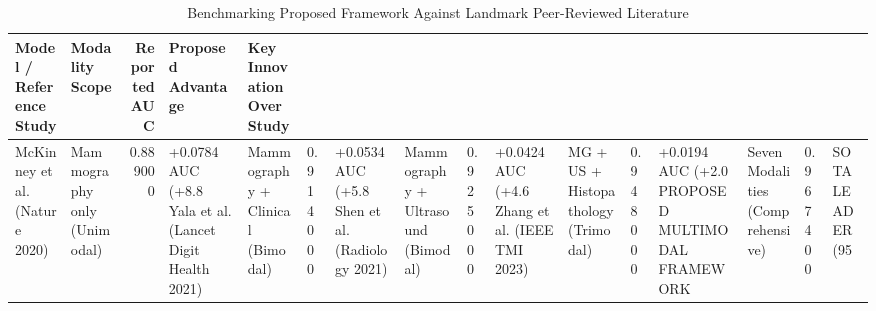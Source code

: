 \begin{table}
\caption{Benchmarking Proposed Framework Against Landmark Peer-Reviewed Literature}
\label{tab:table_6_01_08_benchmark_comparison_against_published_literature}
\begin{tabular}{llrll}
\toprule
Model / Reference Study & Modality Scope & Reported AUC & Proposed Advantage & Key Innovation Over Study \\
\midrule
McKinney et al. (Nature 2020) & Mammography only (Unimodal) & 0.889000 & +0.0784 AUC (+8.8%
Yala et al. (Lancet Digit Health 2021) & Mammography + Clinical (Bimodal) & 0.914000 & +0.0534 AUC (+5.8%
Shen et al. (Radiology 2021) & Mammography + Ultrasound (Bimodal) & 0.925000 & +0.0424 AUC (+4.6%
Zhang et al. (IEEE TMI 2023) & MG + US + Histopathology (Trimodal) & 0.948000 & +0.0194 AUC (+2.0%
PROPOSED MULTIMODAL FRAMEWORK & Seven Modalities (Comprehensive) & 0.967400 & SOTA LEADER (95%
\bottomrule
\end{tabular}
\end{table}
